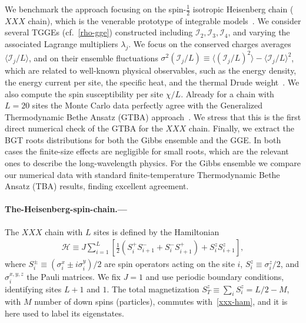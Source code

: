 \documentclass[twocolumn,superscriptaddress,prb,10pt]{revtex4-1}
\begin{document}
We benchmark the approach focusing on the spin-$\frac{1}{2}$ isotropic 
Heisenberg chain ($XXX$ chain), which is the venerable prototype of integrable 
models~\cite{bethe-1931}. We consider several TGGEs 
(cf.~\eqref{rho-gge}) constructed including ${\mathcal I}_2,{\mathcal I}_3,
{\mathcal I}_4$, and varying the associated Lagrange multipliers $\lambda_j$. 
We focus on the conserved charges averages $\langle{\mathcal I}_j/L\rangle$, 
and on their ensemble fluctuations $\sigma^2({\mathcal I}_j/L)\equiv\langle({\mathcal I}_j/L)^2
\rangle-\langle{\mathcal I}_j/L\rangle^2$, which  are related to well-known physical 
observables, such as the energy density, the energy current per site, the specific heat, 
and the thermal Drude weight~\cite{klumper-2002}. We also compute the spin susceptibility 
per site $\chi/L$. Already for a chain with $L=20$ sites the Monte Carlo data perfectly agree 
with the Generalized Thermodynamic Bethe Ansatz (GTBA) approach~\cite{mossel-2012,fagotti-2013a}. 
We stress that this is the first direct numerical check of the GTBA for the $XXX$ chain. Finally, 
we extract the BGT roots distributions for both the Gibbs ensemble and the GGE. 
In both cases the finite-size effects are negligible for small roots, which are the 
relevant ones to describe the long-wavelength physics. For the Gibbs ensemble we compare 
our numerical data with standard finite-temperature Thermodynamic Bethe Ansatz (TBA) results, 
finding excellent agreement. 


\paragraph*{The-Heisenberg-spin-chain.---}

The $XXX$ chain with $L$ sites is defined by the Hamiltonian 
%
\begin{align}
\label{xxx-ham}
{\mathcal H}\equiv J\sum\limits_{i=1}^L\left[\frac{1}{2}(S_i^+S^-_{i+1} 
+S_i^{-}S_{i+1}^+)+S_i^zS_{i+1}^z\right],  
\end{align}
%
where $S^{\pm}_i\equiv (\sigma_i^x\pm i\sigma_i^y)/2$ are spin operators acting on the 
site $i$, $S_i^z\equiv\sigma_i^z/2$, and $\sigma^{x,y,z}_i$ the Pauli matrices. We fix 
$J=1$ and use periodic boundary conditions, identifying sites $L+1$ and $1$. The total 
magnetization $S_{T}^z\equiv\sum_iS_i^z=L/2-M$, with $M$ number of down spins (particles), 
commutes with~\eqref{xxx-ham}, and it is here used to label its eigenstates. 
\end{document}
